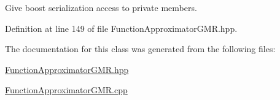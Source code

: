 Give boost serialization access to private members. 



Definition at line 149 of file Function\+Approximator\+G\+M\+R.\+hpp.



The documentation for this class was generated from the following files\+:\begin{DoxyCompactItemize}
\item 
\hyperlink{FunctionApproximatorGMR_8hpp}{Function\+Approximator\+G\+M\+R.\+hpp}\item 
\hyperlink{FunctionApproximatorGMR_8cpp}{Function\+Approximator\+G\+M\+R.\+cpp}\end{DoxyCompactItemize}
